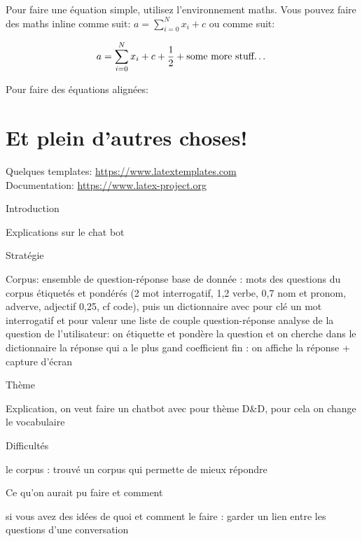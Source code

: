 \documentclass[paper=a4, fontsize=11pt]{article}
\begin{document}
Pour faire une équation simple, utilisez l'environnement maths. Vous pouvez faire des maths inline
comme suit: $a = \sum_{i=0}^{N} x_i + c$ ou comme suit:

\[ a = \sum_{i=0}^{N} x_i + c + \dfrac{1}{2} + \text{some more stuff\dots}\]


Pour faire des équations alignées:


\section{Et plein d'autres choses!}

Quelques templates: \url{https://www.latextemplates.com} \\
Documentation: \url{https://www.latex-project.org}

Introduction

	Explications sur le chat bot


Stratégie

	Corpus: ensemble de question-réponse
	base de donnée : mots des questions du corpus étiquetés et pondérés (2 mot interrogatif, 1,2  verbe, 0,7 nom et pronom, adverve, adjectif 0,25, cf code), puis un dictionnaire avec pour clé un mot interrogatif et pour valeur une liste de couple question-réponse
	analyse de la question de l'utilisateur: on étiquette et pondère la question et on cherche dans le dictionnaire la réponse qui a le plus gand coefficient
	fin : on affiche la réponse
	+ capture d'écran


Thème

	Explication, on veut faire un chatbot avec pour thème D&D, pour cela on change le vocabulaire


Difficultés

	le corpus : trouvé un corpus qui permette de mieux répondre


Ce qu'on aurait pu faire et comment

	si vous avez des idées de quoi et comment le faire : garder un lien entre les questions d'une conversation
\end{document}
